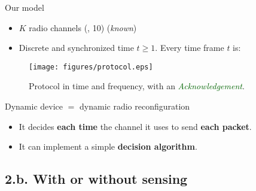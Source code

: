 \documentclass[12pt,english,ignorenonframetext,aspectratio=169,]{beamer}
\providecommand{\tightlist}{%
  \setlength{\itemsep}{0pt}\setlength{\parskip}{0pt}}
\begin{document}
\begin{frame}{Our model}

\begin{itemize}
\tightlist
\item
  \(K\) radio channels (\eg, 10) \hfill{} (\emph{known})
\item
  Discrete and synchronized time \(t\geq1\). Every time frame \(t\) is:
\end{itemize}

\begin{figure}[h!]
\centering
\texttt{[image: figures/protocol.eps]}
\caption{\small{Protocol in time and frequency, with an \textcolor{darkgreen}{\emph{Acknowledgement}}.}}
\end{figure}

\begin{block}{Dynamic device \(=\) dynamic radio reconfiguration}

\begin{itemize}
\tightlist
\item
  It decides \textbf{each time} the channel it uses to send \textbf{each
  packet}.
\item
  It can implement a simple \textbf{decision algorithm}.
\end{itemize}

\end{block}

\end{frame}



\subsection{\hfill{}2.b. With or without sensing\hfill{}}
\end{document}
